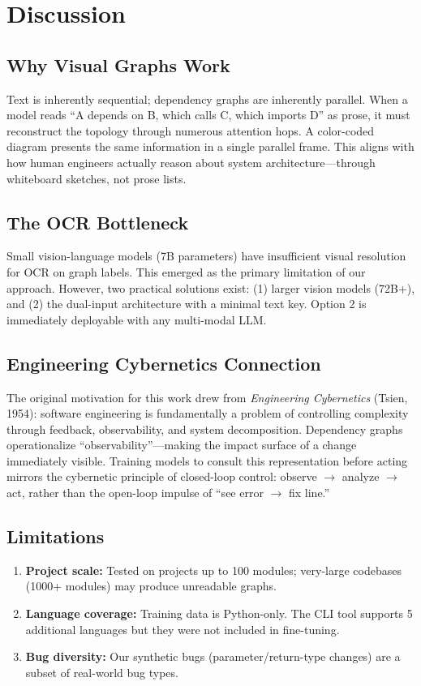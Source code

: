 \documentclass[11pt,a4paper]{article}
\begin{document}
\section{Discussion}

\subsection{Why Visual Graphs Work}
Text is inherently sequential; dependency graphs are inherently parallel. When a model reads ``A depends on B, which calls C, which imports D'' as prose, it must reconstruct the topology through numerous attention hops. A color-coded diagram presents the same information in a single parallel frame. This aligns with how human engineers actually reason about system architecture---through whiteboard sketches, not prose lists.

\subsection{The OCR Bottleneck}
Small vision-language models (7B parameters) have insufficient visual resolution for OCR on graph labels. This emerged as the primary limitation of our approach. However, two practical solutions exist: (1) larger vision models (72B+), and (2) the dual-input architecture with a minimal text key. Option 2 is immediately deployable with any multi-modal LLM.

\subsection{Engineering Cybernetics Connection}
The original motivation for this work drew from \textit{Engineering Cybernetics} (Tsien, 1954): software engineering is fundamentally a problem of controlling complexity through feedback, observability, and system decomposition. Dependency graphs operationalize ``observability''---making the impact surface of a change immediately visible. Training models to consult this representation before acting mirrors the cybernetic principle of closed-loop control: observe $\rightarrow$ analyze $\rightarrow$ act, rather than the open-loop impulse of ``see error $\rightarrow$ fix line.''

\subsection{Limitations}
\begin{enumerate}[nosep]
\item \textbf{Project scale:} Tested on projects up to 100 modules; very-large codebases (1000+ modules) may produce unreadable graphs.
\item \textbf{Language coverage:} Training data is Python-only. The CLI tool supports 5 additional languages but they were not included in fine-tuning.
\item \textbf{Bug diversity:} Our synthetic bugs (parameter/return-type changes) are a subset of real-world bug types.
\end{enumerate}
\end{document}
